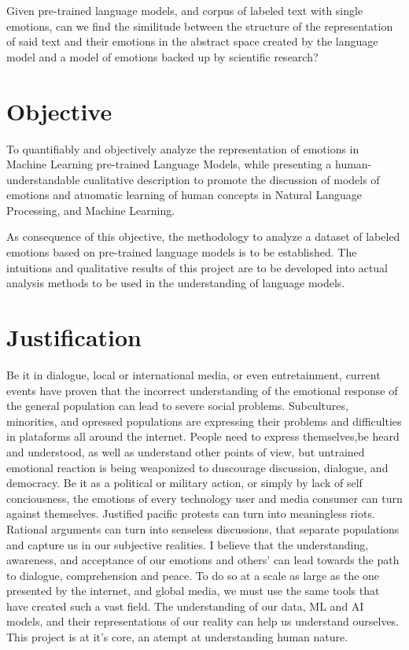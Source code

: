 Given pre-trained language models, and corpus of labeled text with single emotions, can we find the similitude between the structure of the representation of said text and their emotions in the abstract space created by the language model and a model of emotions backed up by scientific research?

\section{Objective}\label{sec:Objective}

To quantifiably and objectively analyze the representation of emotions in Machine Learning pre-trained Language Models, while presenting a human-understandable cualitative description to promote the discussion of models of emotions and atuomatic learning of human concepts in Natural Language Processing, and Machine Learning.

As consequence of this objective, the methodology to analyze a dataset of labeled emotions based on pre-trained language models is to be established. The intuitions and qualitative results of this project are to be developed into actual analysis methods to be used in the understanding of language models.


\section{Justification}\label{sec:Justification}
Be it in dialogue, local or international media, or even entretainment, current events have proven that the incorrect understanding of the emotional response of the general population can lead to severe social problems. Subcultures, minorities, and opressed populations are expressing their problems and difficulties in plataforms all around the internet. People need to express themselves,be heard and understood, as well as understand other points of view, but untrained emotional reaction is being weaponized to duscourage discussion, dialogue, and democracy. Be it as a political or military action, or simply by lack of self conciousness, the emotions of every technology user and media consumer can turn against themselves. Justified pacific protests can turn into meaningless riots. Rational arguments can turn into senseless discussions, that separate populations and capture us in our subjective realities. I believe that the understanding, awareness, and acceptance of our emotions and others' can lead towards the path to dialogue, comprehension and peace. To do so at a scale as large as the one presented by the internet, and global media, we must use the same tools that have created such a vast field. The understanding of our data, ML and AI models, and their representations of our reality can help us understand ourselves. This project is at it's core, an atempt at understanding human nature.
